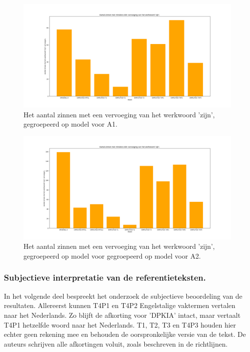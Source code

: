 \begin{figure}[H]
	\includegraphics[width=\linewidth]{img/boxplot-tobe-a1.png}
	\caption{Het aantal zinnen met een vervoeging van het werkwoord 'zijn', gegroepeerd op model voor A1.}
	\label{img:histplot-tobe-a1}
\end{figure}

\begin{figure}[H]
	\includegraphics[width=\linewidth]{img/boxplot-tobe-a2.png}
	\caption{Het aantal zinnen met een vervoeging van het werkwoord 'zijn', gegroepeerd op model voor gegroepeerd op model voor A2.}
	\label{img:histplot-tobe-a2}
\end{figure}

\subsubsection{Subjectieve interpretatie van de referentieteksten.}

In het volgende deel bespreekt het onderzoek de subjectieve beoordeling van de resultaten. Allereerst kunnen T4P1 en T4P2 Engelstalige vaktermen vertalen naar het Nederlands. Zo blijft de afkorting voor 'DPKIA' intact, maar vertaalt T4P1 hetzelfde woord naar het Nederlands.  T1, T2, T3 en T4P3 houden hier echter geen rekening mee en behouden de oorspronkelijke versie van de tekst. De auteurs schrijven alle afkortingen voluit, zoals beschreven in de richtlijnen.

